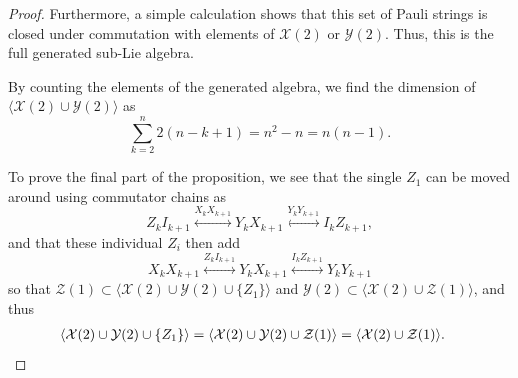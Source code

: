 \documentclass[12pt, a4-paper]{amsart}
\newcommand{\cX}{\mathcal{X}}
\newcommand{\cY}{\mathcal{Y}}
\newcommand{\cZ}{\mathcal{Z}}
\numberwithin{equation}{section}
\begin{document}
\begin{proof}
Furthermore, a simple calculation shows that this set of Pauli strings is closed under commutation with elements of $\cX(2)$ or $\cY(2)$. Thus, this is the full generated sub-Lie algebra.

By counting the elements of the generated algebra, we find the dimension of $\langle \cX(2) \cup \cY(2) \rangle$ as
\begin{equation}
    \sum_{k=2}^{n}2(n-k+1) = n^2-n = n(n-1).
\end{equation}

To prove the final part of the proposition, we see that the single $Z_1$ can be moved around using commutator chains as
\begin{equation}
     Z_k I_{k+1} \stackrel{X_k X_{k+1}}{\longleftrightarrow} Y_k X_{k+1} \stackrel{Y_k Y_{k+1}}{\longleftrightarrow} I_k Z_{k+1},
\end{equation}
and that these individual $Z_i$ then add
\begin{equation}
    X_k X_{k+1} \stackrel{Z_k I_{k+1}}{\longleftrightarrow} Y_k X_{k+1} \stackrel{I_k Z_{k+1}}{\longleftrightarrow} Y_k Y_{k+1}
\end{equation}
so that $\cZ(1) \subset \langle \cX(2) \cup \cY(2) \cup \{Z_1\}\rangle$ and $\cY(2) \subset \langle \cX(2) \cup  \cZ(1) \rangle$, and thus
\begin{align*}
    \langle \cX(2) \cup \cY(2) \cup \{Z_1\} \rangle &= \langle \cX(2) \cup \cY(2) \cup \cZ(1)\rangle = \langle \cX(2) \cup \cZ(1)\rangle. \qedhere 
\end{align*}
\end{proof}
\end{document}
